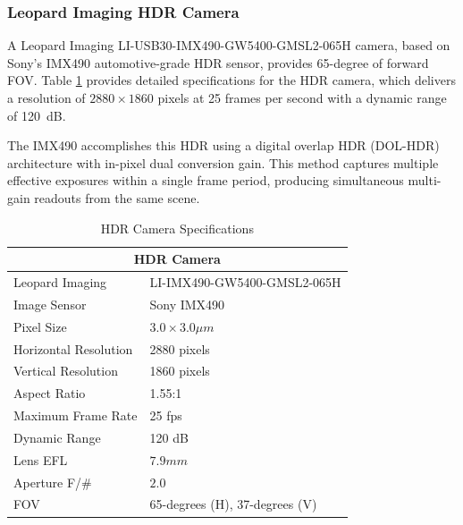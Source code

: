 \documentclass{erauthesis}
\begin{document}
\subsubsection{Leopard Imaging HDR Camera} \label{sensors_HDR}

A Leopard Imaging LI-USB30-IMX490-GW5400-GMSL2-065H camera, based on Sony’s IMX490 automotive-grade \ac{HDR} sensor, provides 65-degree of forward \ac{FOV}.  
Table \ref{table:hdr_camera_specs} provides detailed specifications for the HDR camera, which delivers a resolution of $2880 \times 1860$ pixels at 25 frames per second with a dynamic range of 120~dB.%

The IMX490 accomplishes this \ac{HDR} using a digital overlap \ac{HDR} (DOL-HDR) architecture with in-pixel dual conversion gain.  
This method captures multiple effective exposures within a single frame period, producing simultaneous multi-gain readouts from the same scene.  

\begin{table}[htpb]
\centering
\caption{HDR Camera Specifications}
\begin{tabular}{ll}
\hline
\multicolumn{2}{c}{HDR Camera}\\
\hline
\hline
Leopard Imaging & LI-IMX490-GW5400-GMSL2-065H \\
Image Sensor & Sony IMX490 \\
Pixel Size & $3.0 \times 3.0 \mu m$ \\
Horizontal Resolution & 2880 pixels \\
Vertical Resolution & 1860 pixels \\
Aspect Ratio & 1.55:1 \\
Maximum Frame Rate & 25 fps \\
Dynamic Range & 120 dB \\
Lens \Ac{EFL} & $7.9 mm$\\
Aperture F/\# & $2.0$ \\
\Ac{FOV} & 65-degrees (H), 37-degrees (V) \\
\hline
\end{tabular}
\label{table:hdr_camera_specs}
\end{table}
\end{document}
